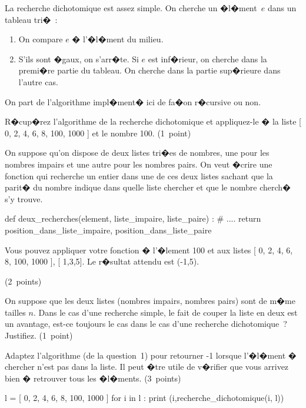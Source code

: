 \exosubject{}
\begin{xexercice}\label{td_note_label1_2014}%

La recherche dichotomique est assez simple. On cherche un �l�ment~$e$ dans un tableau tri�~:

\begin{enumerate}
\item On compare $e$ � l'�l�ment du milieu.
\item S'ils sont �gaux, on s'arr�te. Si $e$ est inf�rieur, on cherche dans la premi�re partie du tableau. On cherche dans la partie sup�rieure dans l'autre cas.
\end{enumerate}

On part de l'algorithme impl�ment� ici de fa�on r�cursive ou non.


\exequest R�cup�rez l'algorithme de la recherche dichotomique et appliquez-le � la liste [ 0, 2, 4, 6, 8, 100, 1000 ] et le nombre 100. (1~point)

\exequest On suppose qu'on dispose de deux listes tri�es de nombres, une pour les nombres impairs et une autre pour les nombres pairs. On veut �crire une fonction qui recherche un entier dans une de ces deux listes sachant que la parit� du nombre indique dans quelle liste chercher et que le nombre cherch� s'y trouve.

\begin{verbatimx}
def deux_recherches(element, liste_impaire, liste_paire) :
    # ....
    return position_dans_liste_impaire, position_dans_liste_paire
\end{verbatimx}

Vous pouvez appliquer votre fonction � l'�lement 100 et aux listes [ 0, 2, 4, 6, 8, 100, 1000 ], [ 1,3,5]. Le r�sultat attendu est (-1,5).

(2~points)

\exequest On suppose que les deux listes (nombres impairs, nombres pairs) sont de m�me tailles $n$. Dans le cas d'une recherche simple, le fait de couper la liste en deux est un avantage, est-ce toujours le cas dans le cas d'une recherche dichotomique~? Justifiez. (1~point)

\exequest Adaptez l'algorithme (de la question~1) pour retourner -1 lorsque l'�l�ment � chercher n'est pas dans la liste. Il peut �tre utile de v�rifier que vous arrivez bien � retrouver tous les �l�ments. (3~points) 

\begin{verbatimx}
l = [ 0, 2, 4, 6, 8, 100, 1000 ]
for i in l :
    print (i,recherche_dichotomique(i, l)) 
\end{verbatimx}



\end{xexercice}
